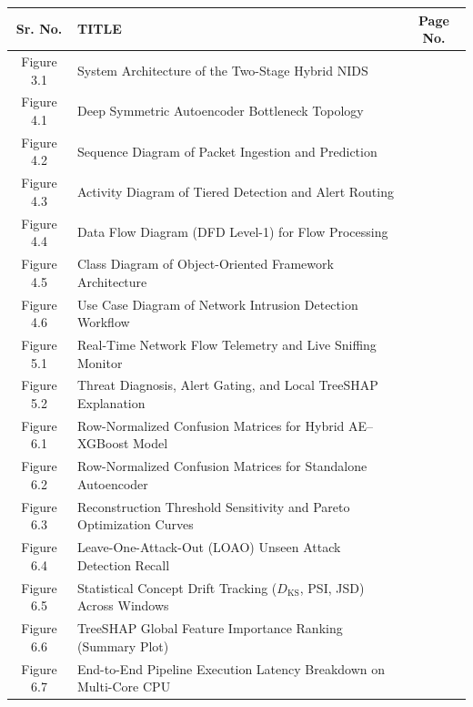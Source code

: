 \documentclass[12pt,a4paper]{report}
\begin{document}
\noindent
\begin{tabularx}{\textwidth}{|c|X|c|}
\hline
\textbf{Sr. No.} & \textbf{\centering TITLE} & \textbf{Page No.} \\
\hline
Figure 3.1 & System Architecture of the Two-Stage Hybrid NIDS & \pageref{fig:ch3_arch} \\
\hline
Figure 4.1 & Deep Symmetric Autoencoder Bottleneck Topology & \pageref{fig:ch4_ae_topology} \\
\hline
Figure 4.2 & Sequence Diagram of Packet Ingestion and Prediction & \pageref{fig:ch4_sequence} \\
\hline
Figure 4.3 & Activity Diagram of Tiered Detection and Alert Routing & \pageref{fig:ch4_activity} \\
\hline
Figure 4.4 & Data Flow Diagram (DFD Level-1) for Flow Processing & \pageref{fig:ch4_dfd} \\
\hline
Figure 4.5 & Class Diagram of Object-Oriented Framework Architecture & \pageref{fig:ch4_class} \\
\hline
Figure 4.6 & Use Case Diagram of Network Intrusion Detection Workflow & \pageref{fig:ch4_usecase} \\
\hline
Figure 5.1 & Real-Time Network Flow Telemetry and Live Sniffing Monitor & \pageref{fig:ch5_dash_main} \\
\hline
Figure 5.2 & Threat Diagnosis, Alert Gating, and Local TreeSHAP Explanation & \pageref{fig:ch5_dash_alert} \\
\hline
Figure 6.1 & Row-Normalized Confusion Matrices for Hybrid AE--XGBoost Model & \pageref{fig:ch6_cm_hybrid} \\
\hline
Figure 6.2 & Row-Normalized Confusion Matrices for Standalone Autoencoder & \pageref{fig:ch6_cm_ae} \\
\hline
Figure 6.3 & Reconstruction Threshold Sensitivity and Pareto Optimization Curves & \pageref{fig:ch6_thresh} \\
\hline
Figure 6.4 & Leave-One-Attack-Out (LOAO) Unseen Attack Detection Recall & \pageref{fig:ch6_loao_plot} \\
\hline
Figure 6.5 & Statistical Concept Drift Tracking ($D_{\text{KS}}$, PSI, JSD) Across Windows & \pageref{fig:ch6_drift} \\
\hline
Figure 6.6 & TreeSHAP Global Feature Importance Ranking (Summary Plot) & \pageref{fig:ch6_shap} \\
\hline
Figure 6.7 & End-to-End Pipeline Execution Latency Breakdown on Multi-Core CPU & \pageref{fig:ch6_latency} \\
\hline
\end{tabularx}
\end{document}
